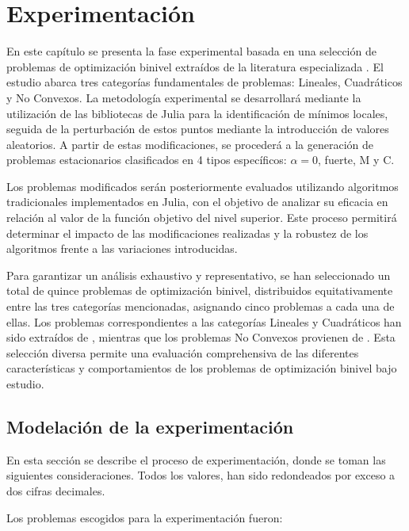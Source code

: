 
\chapter{Experimentación}


En este capítulo se presenta la fase experimental basada en una selección de problemas de optimización binivel extraídos de la literatura especializada \cite{BolibTestProblems}. El estudio abarca tres categorías fundamentales de problemas: Lineales, Cuadráticos y No Convexos. La metodología experimental se desarrollará mediante la utilización de las bibliotecas de Julia para la identificación de mínimos locales, seguida de la perturbación de estos puntos mediante la introducción de valores aleatorios. A partir de estas modificaciones, se procederá a la generación de problemas estacionarios clasificados en 4 tipos específicos: $\alpha = 0$, fuerte, M y C.

Los problemas modificados serán posteriormente evaluados utilizando algoritmos tradicionales implementados en Julia, con el objetivo de analizar su eficacia en relación al valor de la función objetivo del nivel superior. Este proceso permitirá determinar el impacto de las modificaciones realizadas y la robustez de los algoritmos frente a las variaciones introducidas.

Para garantizar un análisis exhaustivo y representativo, se han seleccionado un total de quince problemas de optimización binivel, distribuidos equitativamente entre las tres categorías mencionadas, asignando cinco problemas a cada una de ellas. Los problemas correspondientes a las categorías Lineales y Cuadráticos han sido extraídos de \cite{Floudas1999HandbookOT}, mientras que los problemas No Convexos provienen de \cite{BolibTestProblems}. Esta selección diversa permite una evaluación comprehensiva de las diferentes características y comportamientos de los problemas de optimización binivel bajo estudio.



\section{Modelación de la experimentación}
En esta sección se describe el proceso de experimentación, donde se toman las siguientes consideraciones. 
Todos los valores, han sido redondeados por exceso a dos cifras decimales. 

Los problemas escogidos para la experimentación fueron:

